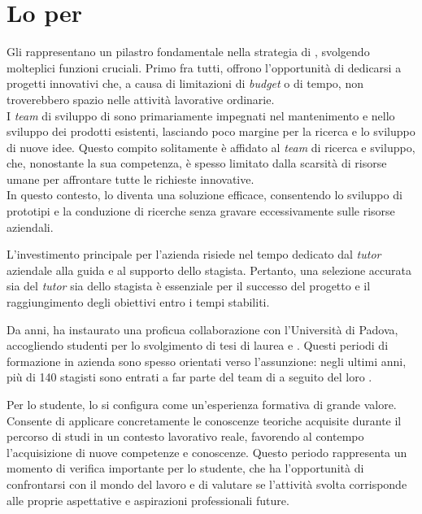\section{Lo \stage{} per \azienda}

Gli \stage{} rappresentano un pilastro fondamentale nella strategia di {\azienda}, svolgendo molteplici funzioni cruciali. 
Primo fra tutti, offrono l'opportunità di dedicarsi a progetti innovativi che, a causa di limitazioni di \textit{budget} o di tempo, 
non troverebbero spazio nelle attività lavorative ordinarie. \\
I \textit{team} di sviluppo di {\azienda} sono primariamente impegnati 
nel mantenimento e nello sviluppo dei prodotti esistenti, lasciando poco margine per la ricerca e lo sviluppo di nuove idee. 
Questo compito solitamente è affidato al \textit{team} di ricerca e sviluppo, che, nonostante la sua competenza, è spesso limitato dalla scarsità 
di risorse umane per affrontare tutte le richieste innovative. \\
In questo contesto, lo \stage{} diventa una soluzione efficace, 
consentendo lo sviluppo di prototipi e la conduzione di ricerche senza gravare eccessivamente sulle risorse aziendali.

L'investimento principale per l'azienda risiede nel tempo dedicato dal \textit{tutor} aziendale alla guida e al supporto dello stagista. 
Pertanto, una selezione accurata sia del \textit{tutor} sia dello stagista è essenziale per il successo del progetto e il raggiungimento 
degli obiettivi entro i tempi stabiliti.

\noindent Da anni, {\azienda} ha instaurato una proficua collaborazione con l'Università di Padova, accogliendo studenti per lo 
svolgimento di tesi di laurea e \stage. Questi periodi di formazione in azienda sono spesso orientati verso l'assunzione: negli 
ultimi anni, più di 140 stagisti sono entrati a far parte del team di {\azienda} a seguito del loro \stage.

Per lo studente, lo \stage{} si configura come un'esperienza formativa di grande valore. Consente di applicare concretamente le 
conoscenze teoriche acquisite durante il percorso di studi in un contesto lavorativo reale, favorendo al contempo l'acquisizione 
di nuove competenze e conoscenze. Questo periodo rappresenta un momento di verifica importante per lo studente, che ha l'opportunità 
di confrontarsi con il mondo del lavoro e di valutare se l'attività svolta corrisponde alle proprie aspettative e aspirazioni professionali future.

